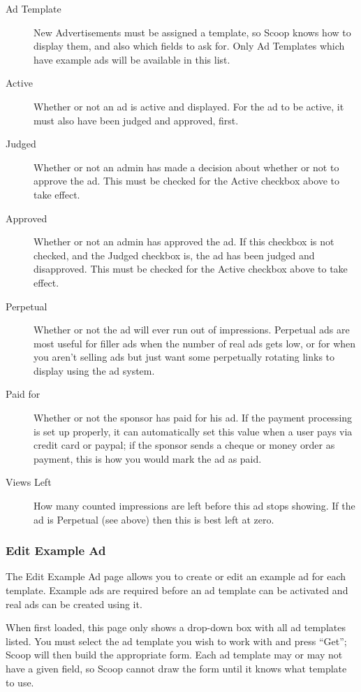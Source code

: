 \begin{description}
\item[Ad Template] New Advertisements must be assigned a template, so Scoop knows how to display them, and also which fields to ask for.  Only Ad Templates which have example ads will be available in this list.
\item[Active] Whether or not an ad is active and displayed.  For the ad to be active, it must also have been judged and approved, first.
\item[Judged] Whether or not an admin has made a decision about whether or not to approve the ad.  This must be checked for the Active checkbox above to take effect.
\item[Approved] Whether or not an admin has approved the ad.  If this checkbox is not checked, and the Judged checkbox is, the ad has been judged and disapproved.  This must be checked for the Active checkbox above to take effect.
\item[Perpetual] Whether or not the ad will ever run out of impressions.  Perpetual ads are most useful for filler ads when the number of real ads gets low, or for when you aren't selling ads but just want some perpetually rotating links to display using the ad system.
\item[Paid for] Whether or not the sponsor has paid for his ad.  If the payment processing is set up properly, it can automatically set this value when a user pays via credit card or paypal; if the sponsor sends a cheque or money order as payment, this is how you would mark the ad as paid.
\item[Views Left] How many counted impressions are left before this ad stops showing.  If the ad is Perpetual (see above) then this is best left at zero.
\end{description}

\subsubsection{Edit Example Ad}
\label{ads-edit-example}

The Edit Example Ad page allows you to create or edit an example ad for each template.  Example ads are required before an ad template can be activated and real ads can be created using it.

When first loaded, this page only shows a drop-down box with all ad templates listed.  You must select the ad template you wish to work with and press ``Get''; Scoop will then build the appropriate form.  Each ad template may or may not have a given field, so Scoop cannot draw the form until it knows what template to use.

